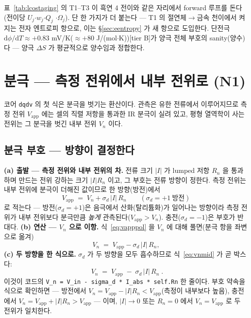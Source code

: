 \documentclass[11pt,a4paper]{article}
\newcommand{\dd}{\mathrm{d}}
\newcommand{\app}{\mathrm{app}}
\newcommand{\code}[1]{\texttt{#1}}
\begin{document}
표~\ref{tab:lcostaging} 의 T1--T3 이 흑연 4 전이와 같은 자리에서 forward 루프를 돈다(전이당 $U_j$$\cdot$$w_j$$\cdot$$Q_j$
$\cdot$$\Omega_j$). 단 한 가지가 더 붙는다 — T1 의 절연체$\to$금속 천이에서 켜지는 전자 엔트로피 항으로, 이는
\S\ref{sec:eentropy} 가 새 항으로 도입한다. 단전극 $\dd\phi/\dd T\approx+0.83$ mV/K(${\approx}+80$ J/(mol$\cdot$K))[tier B]가
양극 전체 부호의 sanity(양수)다 — 양극 $\Delta S$ 가 평균적으로 양수임과 정합한다.

\section{분극 — 측정 전위에서 내부 전위로 (N1)}\label{sec:pol}
코어 \code{dqdv} 의 첫 식은 분극을 벗기는 환산이다. 관측은 유한 전류에서 이루어지므로 측정 전위 $V_\app$ 에는 셀의
직렬 저항을 통과한 IR 분극이 실려 있고, 평형 열역학이 사는 전위는 그 분극을 벗긴 내부 전위 $V_n$ 이다.

\subsection{분극 부호 — 방향이 결정한다}
\textbf{(a) 출발 — 측정 전위와 내부 전위의 차.} 전류 크기 $|I|$ 가 lumped 저항 $R_n$ 을 통과하며 만드는 전위 강하는
크기 $|I|R_n$ 이고, 그 부호는 전류 방향이 정한다. 측정 전위는 내부 전위에 분극이 더해진 값이므로 한 방향(방전)에서
\begin{equation}
V_\app\;=\;V_n+\sigma_d\,|I|\,R_n
\qquad(\sigma_d=+1\ \text{방전})
\label{eq:vapppol}
\end{equation}
로 적는다 — 방전($\sigma_d=+1$)은 음극에서 산화(탈리튬화)가 일어나는 방향이라 측정 전위가 내부 전위보다 분극만큼
\emph{높게} 관측된다($V_\app>V_n$). 충전($\sigma_d=-1$)은 부호가 반대다. \textbf{(b) 연산 — $V_n$ 으로 이항.}
식~\eqref{eq:vapppol} 을 $V_n$ 에 대해 풀면(분극 항을 좌변으로 옮겨)
\begin{equation}
V_n\;=\;V_\app-\sigma_d\,|I|\,R_n,
\label{eq:vnmid}
\end{equation}
\textbf{(c) 두 방향을 한 식으로.} $\sigma_d$ 가 두 방향을 모두 흡수하므로 식~\eqref{eq:vnmid} 가 곧 박스다:
\begin{equation}
\boxed{\;V_n\;=\;V_\app\;-\;\sigma_d\,|I|\,R_n\;.}
\label{eq:vn}
\end{equation}
이것이 코드의 \code{V\_n = V\_in - sigma\_d * I\_abs * self.Rn} 한 줄이다. 부호 약속을 식으로 확인하면 —
방전에서 $V_n=V_\app-|I|R_n<V_\app$(측정이 내부보다 높음), 충전에서 $V_n=V_\app+|I|R_n>V_\app$ — 이며,
$|I|\to0$ 또는 $R_n=0$ 에서 $V_n=V_\app$ 로 두 전위가 일치한다.
\end{document}
